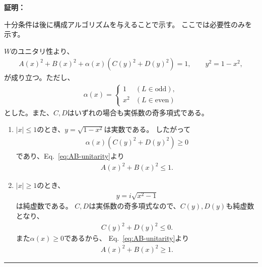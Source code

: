 \documentclass[a4paper,10.5pt]{article}
\numberwithin{equation}{section}
\newenvironment{proofbox}
{\begin{prooflabel}\textbf{証明：}\end{prooflabel}\vspace{0.8em}}
{\par\vspace{1em}\hrule\vspace{1em}}
\begin{document}
\begin{proofbox}
    十分条件は後に構成アルゴリズムを与えることで示す。
    ここでは必要性のみを示す。

    $W$のユニタリ性より、
    \begin{align}
        A(x)^2+B(x)^2
        +\alpha(x)\left(C(y)^2+D(y)^2\right)=1,
        \qquad
        y^2=1-x^2,
        \label{eq:AB-unitarity}
    \end{align}
    が成り立つ。ただし、
    \begin{align*}
        \alpha(x)=
        \begin{cases}
            1 & (L\in\mathrm{odd}),\\
            x^2 & (L\in\mathrm{even})
        \end{cases}
    \end{align*}
    とした。また、$C,D$はいずれの場合も実係数の奇多項式である。

    \begin{enumerate}
        \item $|x|\leq1$のとき、$y=\sqrt{1-x^2}$は実数である。
        したがって
        \begin{align*}
            \alpha(x)\left(C(y)^2+D(y)^2\right)\geq0
        \end{align*}
        であり、Eq.~\eqref{eq:AB-unitarity}より
        \begin{align*}
            A(x)^2+B(x)^2\leq1.
        \end{align*}

        \item $|x|\geq1$のとき、
        \begin{align*}
            y=i\sqrt{x^2-1}
        \end{align*}
        は純虚数である。
        $C,D$は実係数の奇多項式なので、$C(y),D(y)$も純虚数となり、
        \begin{align*}
            C(y)^2+D(y)^2\leq0.
        \end{align*}
        また$\alpha(x)\geq0$であるから、
        Eq.~\eqref{eq:AB-unitarity}より
        \begin{align*}
            A(x)^2+B(x)^2\geq1.
        \end{align*}


\end{enumerate}
\end{proofbox}
\end{document}
